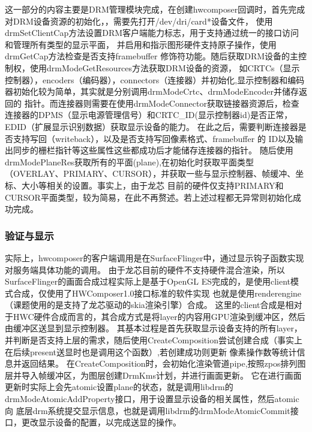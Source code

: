 这一部分的内容主要是DRM管理模块完成，在创建hwcomposer回调时，首先完成对DRM设备资源的初始化，，需要先打开/dev/dri/card*设备文件，
使用drmSetClientCap方法设置DRM客户端能力标志，用于支持通过统一的接口访问和管理所有类型的显示平面，
并启用和指示图形硬件支持原子操作，使用drmGetCap方法检查是否支持framebuffer 修饰符功能。随后获取DRM设备的主控制权，使用drmModeGetResources方法获取DRM设备的资源，
如CRTCs（显示控制器），encoders（编码器），connectors（连接器）并初始化,显示控制器和编码器初始化较为简单，其实就是分别调用drmModeCrtc、drmModeEncoder并储存返回的
指针。而连接器则需要在使用drmModeConnector获取链接器资源后，检查连接器的DPMS（显示电源管理信号）和CRTC\_ID(显示控制器id)是否正常，EDID（扩展显示识别数据）获取显示设备的能力。
在此之后，需要判断连接器是否支持写回（writeback），以及是否支持写回像素格式、framebuffer 的 ID以及输出同步的栅栏指针等这些属性这些都成功后才能储存连接器的指针。
随后使用drmModePlaneRes获取所有的平面(plane),在初始化时获取平面类型（OVERLAY、PRIMARY、CURSOR），并获取一些与显示控制器、帧缓冲、坐标、大小等相关的设置。事实上，由于龙芯
目前的硬件仅支持PRIMARY和CURSOR平面类型，较为简易，在此不再赘述。若上述过程都无异常则初始化成功完成。

\subsubsection{验证与显示}

实际上，hwcomposer的客户端调用是在SurfaceFlinger中，通过显示钩子函数实现对服务端具体功能的调用。
由于龙芯目前的硬件不支持硬件混合渲染，所以SurfaceFlinger的画面合成过程实际上是基于OpenGL ES完成的，是使用client模式合成，仅使用了HWComposer1.0接口标准的软件实现
也就是使用renderengine（课题使用的是支持了龙芯驱动的skia渲染引擎）合成。
这里的client合成是相对于HWC硬件合成而言的，其合成方式是将layer的内容用GPU渲染到缓冲区，然后由缓冲区送显到显示控制器。
其基本过程是首先获取显示设备支持的所有layer，并判断是否支持上层的需求，随后使用CreateComposition尝试创建合成（事实上在后续present送显时也是调用这个函数）,若创建成功则更新
像素操作数等统计信息并返回结果。
在CreateComposition时，会初始化渲染管道pipe,按照zpos排列图层并导入帧缓冲区，为图层创建DrmKms计划，并进行画面更新。
它在进行画面更新时实际上会先atomic设置plane的状态，就是调用libdrm的drmModeAtomicAddProperty接口，用于设置显示设备的相关属性，然后atomic向
底层drm系统提交显示信息，也就是调用libdrm的drmModeAtomicCommit接口，更改显示设备的配置，以完成送显的操作。


